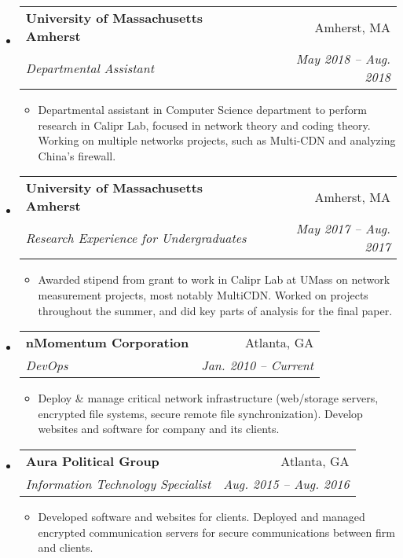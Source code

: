 \documentclass[letterpaper,11pt]{article}
\makeatletter
\newcommand{\resitem}[1]{\item #1 \vspace{-2pt}}
\newcommand{\ressubheading}[4]{
\begin{tabular*}{6.5in}{l@{\cftdotfill{\cftsecdotsep}\extracolsep{\fill}}r}
		\textbf{#1} & #2 \\
		\textit{#3} & \textit{#4} \\
\end{tabular*}\vspace{-6pt}}
\makeatother
\begin{document}
\begin{itemize}

\item[]

\ressubheading{University of Massachusetts Amherst}{Amherst, MA}{Departmental Assistant}{May 2018 -- Aug. 2018}

\begin{itemize}
  \resitem{Departmental assistant in Computer Science department to perform research in Calipr Lab, focused in network theory and coding theory. Working on multiple networks projects, such as Multi-CDN and analyzing China's firewall.}

\end{itemize}

\item[]

\ressubheading{University of Massachusetts Amherst}{Amherst, MA}{Research Experience for Undergraduates}{May 2017 -- Aug. 2017}

\begin{itemize}
  \resitem{Awarded stipend from grant to work in Calipr Lab at UMass on network measurement projects, most notably MultiCDN. Worked on projects throughout the summer, and did key parts of analysis for the final paper.}

\end{itemize}

\item[]

	\ressubheading{nMomentum Corporation}{Atlanta, GA}{DevOps}{Jan. 2010 -- Current}

  \begin{itemize}
		\resitem{Deploy \& manage critical network infrastructure (web/storage servers, encrypted file systems, secure remote file synchronization). Develop websites and software for company and its clients.}

	\end{itemize}

  \item[]

  	\ressubheading{Aura Political Group}{Atlanta, GA}{Information Technology Specialist}{Aug. 2015 -- Aug. 2016}

    \begin{itemize}
  		\resitem{Developed software and websites for clients. Deployed and managed encrypted communication servers for secure communications between firm and clients.}

  	\end{itemize}

\end{itemize}
\end{document}
